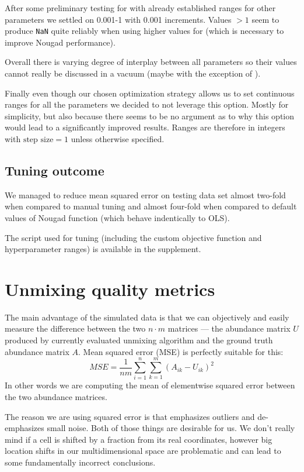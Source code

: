 After some preliminary testing for  with already established ranges for other parameters we settled on 0.001-1 with 0.001 increments. Values $> 1$ seem to produce \texttt{NaN} quite reliably when using higher values for  (which is necessary to improve Nougad performance).

Overall there is varying degree of interplay between all parameters so their values cannot really be discussed in a vacuum (maybe with the exception of ).

Finally even though our chosen optimization strategy allows us to set continuous ranges for all the parameters we decided to not leverage this option. Mostly for simplicity, but also because there seems to be no argument as to why this option would lead to a significantly improved results. Ranges are therefore in integers with $\text{step size} = 1$ unless otherwise specified.

\subsection{Tuning outcome}
We managed to reduce mean squared error on testing data set almost two-fold when compared to manual tuning and almost four-fold when compared to default values of Nougad function (which behave indentically to OLS).

The script used for tuning (including the custom objective function and hyperparameter ranges) is available in the supplement.
 
\section{Unmixing quality metrics}
The main advantage of the simulated data is that we can objectively and easily measure the difference between the two $n \cdot m$ matrices --- the abundance matrix $U$ produced by currently evaluated unmixing algorithm and the ground truth abundance matrix $A$. Mean squared error (MSE) is perfectly suitable for this:
\[MSE=\frac{1}{nm}\sum_{i=1}^{n}\sum_{k=1}^{m}(A_{ik}-U_{ik})^2\]
In other words we are computing the mean of elementwise squared error between the two abundance matrices.

The reason we are using squared error is that emphasizes outliers and de-emphasizes small noise. Both of those things are desirable for us. We don't really mind if a cell is shifted by a fraction from its real coordinates, however big location shifts in our multidimensional space are problematic and can lead to some fundamentally incorrect conclusions. 

